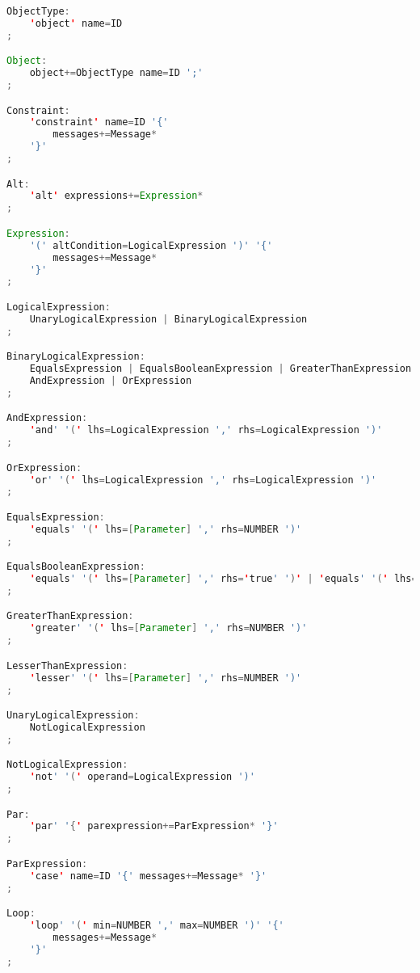 \begin{lstlisting}[language=java, caption={\textit{Xtext} nyelvtan specifikációja.},captionpos=b,label=xtext_tpsc_grammar]
ObjectType:
	'object' name=ID
;

Object:
	object+=ObjectType name=ID ';'
;

Constraint:
	'constraint' name=ID '{'
		messages+=Message* 
	'}'
;

Alt:
	'alt' expressions+=Expression*
;

Expression:
	'(' altCondition=LogicalExpression ')' '{'
		messages+=Message*
	'}'
;

LogicalExpression:
	UnaryLogicalExpression | BinaryLogicalExpression
;

BinaryLogicalExpression:
	EqualsExpression | EqualsBooleanExpression | GreaterThanExpression | LesserThanExpression |
	AndExpression | OrExpression
;

AndExpression:
	'and' '(' lhs=LogicalExpression ',' rhs=LogicalExpression ')'
;

OrExpression:
	'or' '(' lhs=LogicalExpression ',' rhs=LogicalExpression ')'
;

EqualsExpression:
	'equals' '(' lhs=[Parameter] ',' rhs=NUMBER ')'
;

EqualsBooleanExpression:
	'equals' '(' lhs=[Parameter] ',' rhs='true' ')' | 'equals' '(' lhs=[Parameter] ',' rhs='false' ')'
;

GreaterThanExpression:
	'greater' '(' lhs=[Parameter] ',' rhs=NUMBER ')'
;

LesserThanExpression:
	'lesser' '(' lhs=[Parameter] ',' rhs=NUMBER ')'
;

UnaryLogicalExpression:
	NotLogicalExpression
;

NotLogicalExpression:
	'not' '(' operand=LogicalExpression ')'
;

Par:
	'par' '{' parexpression+=ParExpression* '}'
;

ParExpression:
	'case' name=ID '{' messages+=Message* '}'
;

Loop:
	'loop' '(' min=NUMBER ',' max=NUMBER ')' '{' 
		messages+=Message*
	'}'
;
\end{lstlisting}
